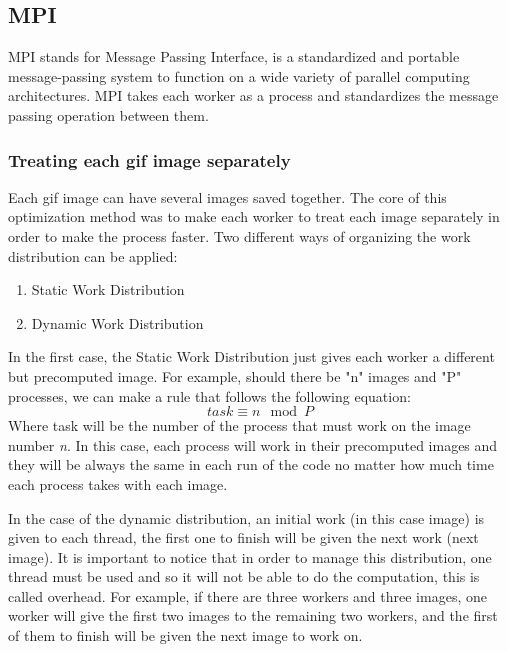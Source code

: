 \documentclass[conference,compsoc]{IEEEtran}
\begin{document}
\subsection{MPI} \label{sec:MPI}
MPI stands for Message Passing Interface, is a standardized and portable message-passing system to function on a wide variety of parallel computing architectures. MPI takes each worker as a process and standardizes the message passing operation between them.
\subsubsection{Treating each gif image separately} \label{sec:treating-each-image-sep}
Each gif image can have several images saved together. The core of this optimization method was to make each worker to treat each image separately in order to make the process faster.
Two different ways of organizing the work distribution can be applied:
\begin{enumerate}
	\item Static Work Distribution
	\item Dynamic Work Distribution
\end{enumerate}
In the first case, the Static Work Distribution just gives each worker a different but precomputed image. For example, should there be "n" images and "P" processes, we can make a rule that follows the following equation:
\begin{equation}
task \equiv n \mod P
\end{equation} 
Where task will be the number of the process that must work on the image number \textit{n}. In this case, each process will work in their precomputed images and they will be always the same in each run of the code no matter how much time each process takes with each image.

In the case of the dynamic distribution, an initial work (in this case image) is given to each thread, the first one to finish will be given the next work (next image). It is important to notice that in order to manage this distribution, one thread must be used and so it will not be able to do the computation, this is called overhead. For example, if there are three workers and three images, one worker will give the first two images to the remaining two workers, and the first of them to finish will be given the next image to work on.
\end{document}
